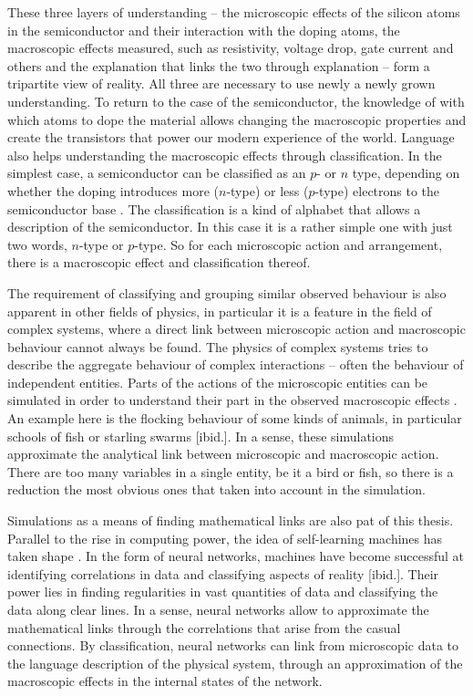 \documentclass[10pt, a4paper]{UUThesisTemplate}
\begin{document}
These three layers of understanding – the microscopic effects of the silicon atoms in the semiconductor and their interaction with the doping atoms, the macroscopic effects measured, such as resistivity, voltage drop, gate current and others and the explanation that links the two through explanation – form a tripartite view of reality. All three are necessary to use newly a newly grown understanding. To return to the case of the semiconductor, the knowledge of with which atoms to dope the material allows changing the macroscopic properties and create the transistors that power our modern experience of the world. Language also helps understanding the macroscopic effects through classification. In the simplest case, a semiconductor can be classified as an $p$- or $n$ type, depending on whether the doping introduces more ($n$-type) or less ($p$-type) electrons to the semiconductor base \cite{feynman}. The classification is a kind of alphabet that allows a description of the semiconductor. In this case it is a rather simple one with just two words, $n$-type or $p$-type. So for each microscopic action and arrangement, there is a macroscopic effect and classification thereof.

The requirement of classifying and grouping similar observed behaviour is also apparent in other fields of physics, in particular it is a feature in the field of complex systems, where a direct link between microscopic action and macroscopic behaviour cannot always be found. The physics of complex systems tries to describe the aggregate behaviour of complex interactions – often the behaviour of independent entities. Parts of the actions of the microscopic entities can be simulated in order to understand their part in the observed macroscopic effects \cite{flocking}. An example here is the flocking behaviour of some kinds of animals, in particular schools of fish or starling swarms [ibid.]. In a sense, these simulations approximate the analytical link between microscopic and macroscopic action. There are too many variables in a single entity, be it a bird or fish, so there is a reduction the most obvious ones that taken into account in the simulation.

Simulations as a means of finding mathematical links are also pat of this thesis. Parallel to the rise in computing power, the idea of self-learning machines has taken shape \cite{NN}. In the form of neural networks, machines have become successful at identifying correlations in data and classifying aspects of reality [ibid.]. Their power lies in finding regularities in vast quantities of data and classifying the data along clear lines. In a sense, neural networks allow to approximate the mathematical links through the correlations that arise from the casual connections. By classification, neural networks can link from microscopic data to the language description of the physical system, through an approximation of the macroscopic effects in the internal states of the network.
\end{document}
